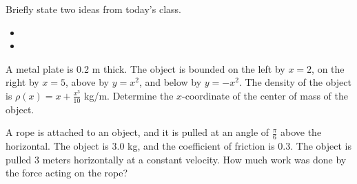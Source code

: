 \postClass

\begin{problem}
\item Briefly state two ideas from today's class.
  \begin{itemize}
  \item
  \item
  \end{itemize}
\item A metal plate is 0.2 m thick. The object is bounded on the left by
  $x=2$, on the right by $x=5$, above by $y=x^2$, and below by
  $y=-x^2$. The density of the object is $\rho(x)=x+\frac{x^3}{10}$
  kg/m. Determine the $x$-coordinate of the center of mass of the
  object.
    \vfill
    \clearpage
\end{problem}



\begin{problem}
\item A rope is attached to an object, and it is pulled at an angle of
  $\frac{\pi}{6}$ above the horizontal. The object is 3.0 kg, and the
  coefficient of friction is 0.3. The object is pulled 3 meters
  horizontally at a constant velocity. How much work was done by the
  force acting on the rope?

  \vfill
\end{problem}


